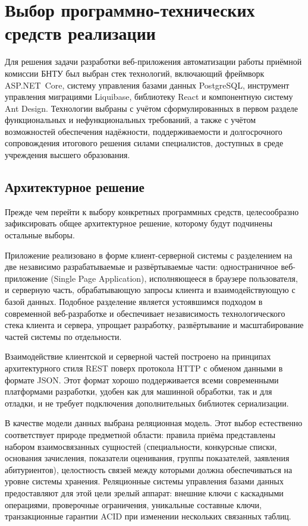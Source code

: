 \section{Выбор программно-технических средств реализации}

Для решения задачи разработки веб-приложения автоматизации работы приёмной комиссии БНТУ был выбран стек технологий, включающий фреймворк ASP.NET~Core, систему управления базами данных PostgreSQL, инструмент управления миграциями Liquibase, библиотеку React и компонентную систему Ant Design.
Технологии выбраны с учётом сформулированных в первом разделе функциональных и нефункциональных требований, а также с учётом возможностей обеспечения надёжности, поддерживаемости и долгосрочного сопровождения итогового решения силами специалистов, доступных в среде учреждения высшего образования.

\subsection{Архитектурное решение}

Прежде чем перейти к выбору конкретных программных средств, целесообразно зафиксировать общее архитектурное решение, которому будут подчинены остальные выборы.

Приложение реализовано в форме клиент-серверной системы с разделением на две независимо разрабатываемые и развёртываемые части: одностраничное веб-приложение (Single Page Application), исполняющееся в браузере пользователя, и серверную часть, обрабатывающую запросы клиента и взаимодействующую с базой данных.
Подобное разделение является устоявшимся подходом в современной веб-разработке и обеспечивает независимость технологического стека клиента и сервера, упрощает разработку, развёртывание и масштабирование частей системы по отдельности.

Взаимодействие клиентской и серверной частей построено на принципах архитектурного стиля REST поверх протокола HTTP с обменом данными в формате JSON.
Этот формат хорошо поддерживается всеми современными платформами разработки, удобен как для машинной обработки, так и для отладки, и не требует подключения дополнительных библиотек сериализации.

В качестве модели данных выбрана реляционная модель.
Этот выбор естественно соответствует природе предметной области: правила приёма представлены набором взаимосвязанных сущностей (специальности, конкурсные списки, основания зачисления, показатели оценивания, группы показателей, заявления абитуриентов), целостность связей между которыми должна обеспечиваться на уровне системы хранения.
Реляционные системы управления базами данных предоставляют для этой цели зрелый аппарат: внешние ключи с каскадными операциями, проверочные ограничения, уникальные составные ключи, транзакционные гарантии ACID при изменении нескольких связанных таблиц.

